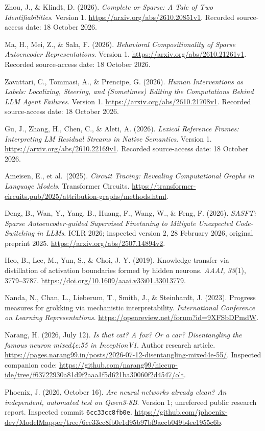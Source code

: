 \documentclass[
  british,
  11pt,
  a4paper,
]{article}
\begin{document}
Zhou, J., \& Klindt, D. (2026). \emph{Complete or Sparse: A Tale of Two
Identifiabilities}. Version 1. \url{https://arxiv.org/abs/2610.20851v1}.
Recorded source-access date: 18 October 2026.

Ma, H., Mei, Z., \& Sala, F. (2026). \emph{Behavioral Compositionality
of Sparse Autoencoder Representations}. Version 1.
\url{https://arxiv.org/abs/2610.21261v1}. Recorded source-access date:
18 October 2026.

Zavattari, C., Tommasi, A., \& Prencipe, G. (2026). \emph{Human
Interventions as Labels: Localizing, Steering, and (Sometimes) Editing
the Computations Behind LLM Agent Failures}. Version 1.
\url{https://arxiv.org/abs/2610.21708v1}. Recorded source-access date:
18 October 2026.

Gu, J., Zhang, H., Chen, C., \& Aleti, A. (2026). \emph{Lexical
Reference Frames: Interpreting LM Residual Streams in Native Semantics}.
Version 1. \url{https://arxiv.org/abs/2610.22169v1}. Recorded
source-access date: 18 October 2026.

Ameisen, E., et al.~(2025). \emph{Circuit Tracing: Revealing
Computational Graphs in Language Models}. Transformer Circuits.
\url{https://transformer-circuits.pub/2025/attribution-graphs/methods.html}.

Deng, B., Wan, Y., Yang, B., Huang, F., Wang, W., \& Feng, F. (2026).
\emph{SASFT: Sparse Autoencoder-guided Supervised Finetuning to Mitigate
Unexpected Code-Switching in LLMs}. ICLR 2026; inspected version 2, 28
February 2026, original preprint 2025.
\url{https://arxiv.org/abs/2507.14894v2}.

Heo, B., Lee, M., Yun, S., \& Choi, J. Y. (2019). Knowledge transfer via
distillation of activation boundaries formed by hidden neurons.
\emph{AAAI, 33}(1), 3779--3787.
\url{https://doi.org/10.1609/aaai.v33i01.33013779}.

Nanda, N., Chan, L., Lieberum, T., Smith, J., \& Steinhardt, J. (2023).
Progress measures for grokking via mechanistic interpretability.
\emph{International Conference on Learning Representations}.
\url{https://openreview.net/forum?id=9XFSbDPmdW}.

Narang, H. (2026, July 12). \emph{Is that cat? A fox? Or a car?
Disentangling the famous neuron mixed4e:55 in InceptionV1}. Author
research article.
\url{https://pages.narang99.in/posts/2026-07-12-disentangling-mixed4e-55/}.
Inspected companion code:
\url{https://github.com/narang99/hiccup-ide/tree/f63722930a81d9f2aaa1f5d621ba30060f2d4547/olt}.

Phoenix, J. (2026, October 16). \emph{Are neural networks already clean?
An independent, automated test on Qwen3-8B}. Version 1; unrefereed
public research report. Inspected commit \texttt{6cc33cc8fb0e}.
\url{https://github.com/jphoenix-dev/ModelMapper/tree/6cc33cc8fb0e1d95b97bf9aecb049b4ee1955c6b}.
\end{document}
